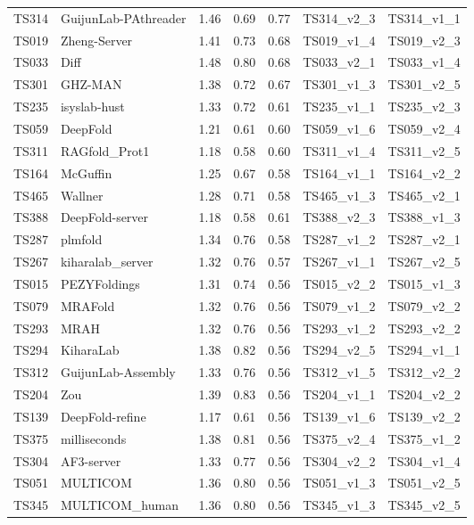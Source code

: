 \begin{longtable}{lllllll}
TS314 & GuijunLab-PAthreader & 1.46 & 0.69 & 0.77 & TS314\_v2\_3 & TS314\_v1\_1 \\ 
TS019 & Zheng-Server & 1.41 & 0.73 & 0.68 & TS019\_v1\_4 & TS019\_v2\_3 \\ 
TS033 & Diff & 1.48 & 0.80 & 0.68 & TS033\_v2\_1 & TS033\_v1\_4 \\ 
TS301 & GHZ-MAN & 1.38 & 0.72 & 0.67 & TS301\_v1\_3 & TS301\_v2\_5 \\ 
TS235 & isyslab-hust & 1.33 & 0.72 & 0.61 & TS235\_v1\_1 & TS235\_v2\_3 \\ 
TS059 & DeepFold & 1.21 & 0.61 & 0.60 & TS059\_v1\_6 & TS059\_v2\_4 \\ 
TS311 & RAGfold\_Prot1 & 1.18 & 0.58 & 0.60 & TS311\_v1\_4 & TS311\_v2\_5 \\ 
TS164 & McGuffin & 1.25 & 0.67 & 0.58 & TS164\_v1\_1 & TS164\_v2\_2 \\ 
TS465 & Wallner & 1.28 & 0.71 & 0.58 & TS465\_v1\_3 & TS465\_v2\_1 \\ 
TS388 & DeepFold-server & 1.18 & 0.58 & 0.61 & TS388\_v2\_3 & TS388\_v1\_3 \\ 
TS287 & plmfold & 1.34 & 0.76 & 0.58 & TS287\_v1\_2 & TS287\_v2\_1 \\ 
TS267 & kiharalab\_server & 1.32 & 0.76 & 0.57 & TS267\_v1\_1 & TS267\_v2\_5 \\ 
TS015 & PEZYFoldings & 1.31 & 0.74 & 0.56 & TS015\_v2\_2 & TS015\_v1\_3 \\ 
TS079 & MRAFold & 1.32 & 0.76 & 0.56 & TS079\_v1\_2 & TS079\_v2\_2 \\ 
TS293 & MRAH & 1.32 & 0.76 & 0.56 & TS293\_v1\_2 & TS293\_v2\_2 \\ 
TS294 & KiharaLab & 1.38 & 0.82 & 0.56 & TS294\_v2\_5 & TS294\_v1\_1 \\ 
TS312 & GuijunLab-Assembly & 1.33 & 0.76 & 0.56 & TS312\_v1\_5 & TS312\_v2\_2 \\ 
TS204 & Zou & 1.39 & 0.83 & 0.56 & TS204\_v1\_1 & TS204\_v2\_2 \\ 
TS139 & DeepFold-refine & 1.17 & 0.61 & 0.56 & TS139\_v1\_6 & TS139\_v2\_2 \\ 
TS375 & milliseconds & 1.38 & 0.81 & 0.56 & TS375\_v2\_4 & TS375\_v1\_2 \\ 
TS304 & AF3-server & 1.33 & 0.77 & 0.56 & TS304\_v2\_2 & TS304\_v1\_4 \\ 
TS051 & MULTICOM & 1.36 & 0.80 & 0.56 & TS051\_v1\_3 & TS051\_v2\_5 \\ 
TS345 & MULTICOM\_human & 1.36 & 0.80 & 0.56 & TS345\_v1\_3 & TS345\_v2\_5 \\ 

\end{longtable}
